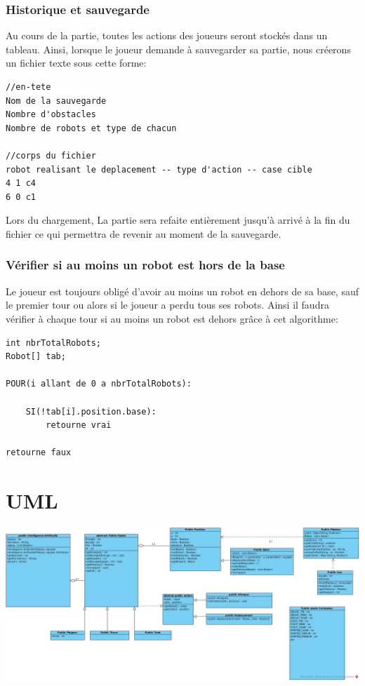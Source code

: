 \documentclass[12pt]{article}
\begin{document}
\section{Historique et sauvegarde}
Au cours de la partie, toutes les actions des joueurs seront stockés dans un tableau.
Ainsi, lorsque le joueur demande à sauvegarder sa partie, nous créerons un fichier texte sous cette forme:
\begin{lstlisting}
//en-tete
Nom de la sauvegarde
Nombre d'obstacles
Nombre de robots et type de chacun

//corps du fichier
robot realisant le deplacement -- type d'action -- case cible
4 1 c4
6 0 c1
\end{lstlisting}
Lors du chargement, La partie sera refaite entièrement jusqu'à arrivé à la fin du fichier ce qui permettra de revenir au moment de la sauvegarde.

\newpage
\section{Vérifier si au moins un robot est hors de la base}
Le joueur est toujours obligé d'avoir au moins un robot en dehors de sa base, sauf le premier tour ou alors si le joueur a perdu tous ses robots. Ainsi il faudra vérifier à chaque tour si au moins un robot est dehors grâce à cet algorithme:

\begin{lstlisting}
int nbrTotalRobots;
Robot[] tab;

POUR(i allant de 0 a nbrTotalRobots):

	SI(!tab[i].position.base):
		retourne vrai

retourne faux
\end{lstlisting}


\part*{UML}

\includegraphics[scale=0.4, angle = -90]{img/uml.jpg}
\end{document}
